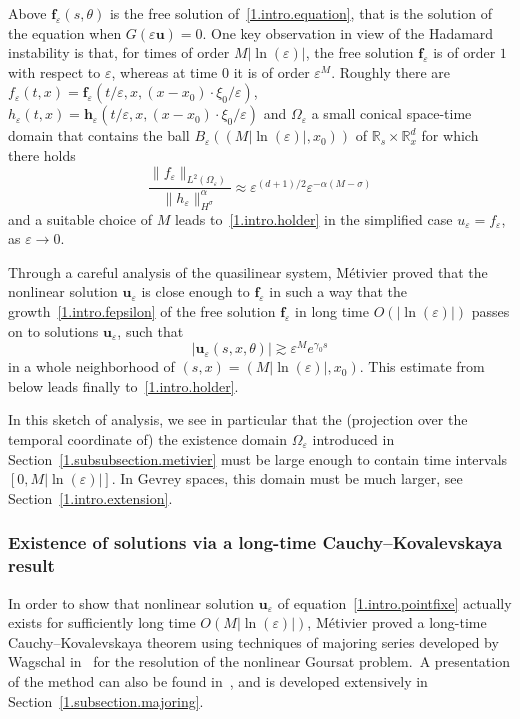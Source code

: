 \documentclass[AHL,Unicode,longabstracts,published]{cedram}
\theoremstyle{plain}
\newcommand*\e{\varepsilon}
\newcommand*\R{{\mathbb R}}
\newcommand{\alf}{\alpha}%
\newcommand*\g{\gamma}
\newcommand{\ubf}{{\mathbf u}}
\newcommand*\f{{\mathbf f}}
\newcommand*\h{{\mathbf h}}
\begin{document}
Above $ \f_{\e}(s,\theta) $ is the free solution of~\eqref{1.intro.equation}, that is the solution of the equation when $G(\e \ubf) = 0$. One key observation in view of the Hadamard instability is that, for times of order $M|\ln(\e)|$, the free solution $ \f_{\e} $ is of order $1$ with respect to $\e$, whereas at time $0$ it is of order $\e^{M}$. Roughly there are $f_{\e}(t,x) = \f_{\e}(t/\e,x,(x-x_0)\cdot\xi_0/\e)$, $h_{\e}(t,x) = \h_{\e}(t/\e,x,(x-x_0)\cdot\xi_0/\e)$ and $\Omega_{\e}$ a small conical space-time domain that contains the ball $B_{\e}((M|\ln(\e)|,x_0))$ of $\R_s\times\R_x^{d}$ for which there holds
\begin{equation}\label{1.intro.ratio}
\frac{\|f_{\e}\|_{L^2(\Omega_{\e})}}{\|h_{\e}\|^{\alf}_{H^{\sigma}}} \approx \e^{(d+1)/2} \e^{-\alf(M-\sigma)}
\end{equation}
and a suitable choice of $M$ leads to~\eqref{1.intro.holder} in the simplified case $u_{\e} = f_{\e}$, as $\e\to0$.

Through a careful analysis of the quasilinear system, Métivier proved that the nonlinear solution $\ubf_{\e}$ is close enough to $\f_{\e}$ in such a way that the growth~\eqref{1.intro.fepsilon} of the free solution $\f_{\e}$ in long time $O(|\ln(\e)|)$ passes on to solutions $\ubf_{\e}$, such that
\begin{equation}\label{1.intro.growth}
|\ubf_{\e}(s,x,\theta)| \gtrsim \e^{M} e^{\g_0 s}
\end{equation}
in a whole neighborhood of $(s,x) = (M|\ln(\e)|,x_0)$. This estimate from below leads finally to~\eqref{1.intro.holder}.

In this sketch of analysis, we see in particular that the (projection over the temporal coordinate of) the existence domain $\Omega_{\e}$ introduced in Section~\ref{1.subsubsection.metivier} must be large enough to contain time intervals $[0,M|\ln(\e)|]$. In Gevrey spaces, this domain must be much larger, see Section~\ref{1.intro.extension}.


\subsubsection{Existence of solutions via a long-time Cauchy--Kovalevskaya result}\label{1.intro.ck}

In order to show that nonlinear solution $\ubf_{\e}$ of equation~\eqref{1.intro.pointfixe} actually exists for sufficiently long time $O(M|\ln(\e)|)$, Métivier proved a long-time Cauchy--Kovalevskaya theorem using techniques of majoring series developed by Wagschal in~\cite{wagschal1979probleme} for the resolution of the nonlinear Goursat problem.~A presentation of the method can also be found in~\cite{cartan1995theorie}, and is developed extensively in Section~\ref{1.subsection.majoring}.
\end{document}
